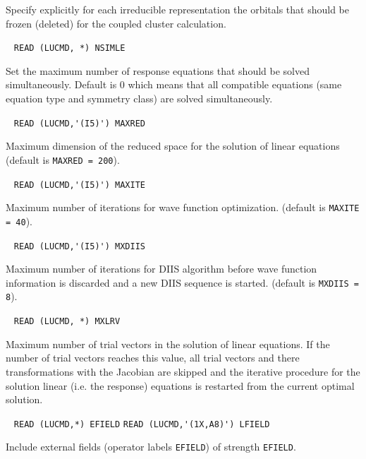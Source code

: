 \begin{description}
    Specify explicitly for each irreducible representation the
    orbitals that should be frozen (deleted) for the coupled cluster
    calculation.
 
\item[\Key{NSIMLE}] \verb| |\newline
  \verb|READ (LUCMD, *) NSIMLE|

  Set the maximum number of response equations that should be 
  solved simultaneously. Default is 0 which means that all
  compatible equations (same equation type and symmetry class) 
  are solved simultaneously.
 
\item[\Key{MAXRED}] \verb| |\newline 
  \verb|READ (LUCMD,'(I5)') MAXRED|

  Maximum dimension of the reduced space for the 
  solution of linear equations (default is \verb+MAXRED = 200+).
 
\item[\Key{MAXITE}] \verb| |\newline
  \verb|READ (LUCMD,'(I5)') MAXITE|

  Maximum number of iterations for wave function optimization.
  (default is \verb+MAXITE = 40+).
 
\item[\Key{MXDIIS}] \verb| |\newline
  \verb|READ (LUCMD,'(I5)') MXDIIS|

  Maximum number of iterations for DIIS algorithm
  before wave function information is discarded and a new DIIS 
  sequence is started. 
  (default is \verb+MXDIIS = 8+).
 
\item[\Key{MXLRV}] \verb| |\newline
  \verb|READ (LUCMD, *) MXLRV|

  Maximum number of trial vectors in the solution of 
  linear equations. If the number of trial vectors reaches this
  value, all trial vectors and there transformations with the
  Jacobian are skipped and the iterative procedure for the solution
  linear (i.e. the response) equations is restarted from the current 
  optimal solution. 
 
\item[\Key{FIELD }] \verb| |\newline
    \verb|READ (LUCMD,*) EFIELD|\newline
    \verb|READ (LUCMD,'(1X,A8)') LFIELD|

    Include external fields (operator labels \verb+EFIELD+)
    of strength \verb+EFIELD+.
 

\end{description}
